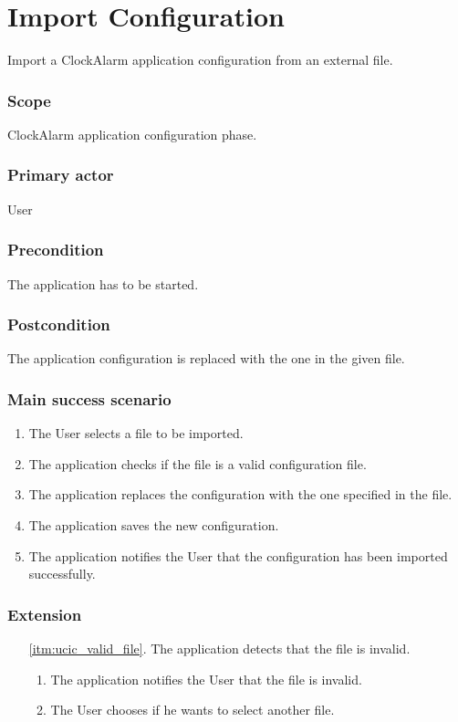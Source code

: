 \section{Import Configuration}\label{subsec:usecase_import_configuration}
Import a ClockAlarm application configuration from an external file.
\subsubsection{Scope}
ClockAlarm application configuration phase.
\subsubsection{Primary actor}
User
\subsubsection{Precondition}
The application has to be started.
\subsubsection{Postcondition}
The application configuration is replaced with the one in the given file.
\subsubsection{Main success scenario}
\begin{enumerate}
	\item The User selects a file to be imported.
	\item\label{itm:ucic_valid_file} The application checks if the file is a valid configuration file.
	\item The application replaces the configuration with the one specified in the file.
	\item The application saves the new configuration.
	\item The application notifies the User that the configuration has been imported successfully.
\end{enumerate}
\subsubsection{Extension}
\begin{enumerate}
	\item[\ref{itm:ucic_valid_file}.] The application detects that the file is invalid.
		\begin{enumerate}[i]
			\item The application notifies the User that the file is invalid.
			\item The User chooses if he wants to select another file.
		\end{enumerate}
\end{enumerate}
